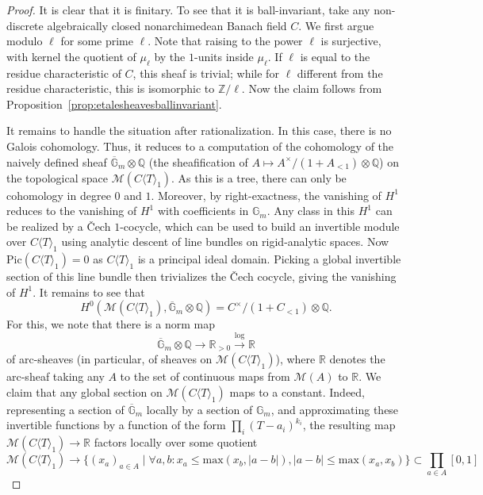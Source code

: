 \documentclass[11pt]{amsart}
\numberwithin{equation}{section}
\numberwithin{theorem}{section}
\theoremstyle{definition}
\begin{document}
\begin{proof} It is clear that it is finitary. To see that it is ball-invariant, take any non-discrete algebraically closed nonarchimedean Banach field $C$. We first argue modulo $\ell$ for some prime $\ell$. Note that raising to the power $\ell$ is surjective, with kernel the quotient of $\mu_{\ell}$ by the $1$-units inside $\mu_\ell$. If $\ell$ is equal to the residue characteristic of $C$, this sheaf is trivial; while for $\ell$ different from the residue characteristic, this is isomorphic to $\mathbb Z/\ell$. Now the claim follows from Proposition~\ref{prop:etalesheavesballinvariant}.

It remains to handle the situation after rationalization. In this case, there is no Galois cohomology. Thus, it reduces to a computation of the cohomology of the naively defined sheaf $\overline{\mathbb G}_m\otimes \mathbb Q$ (the sheafification of $A\mapsto A^\times/(1 + A_{<1})\otimes \mathbb Q$) on the topological space $\mathcal M(C\langle T\rangle_1)$. As this is a tree, there can only be cohomology in degree $0$ and $1$. Moreover, by right-exactness, the vanishing of $H^1$ reduces to the vanishing of $H^1$ with coefficients in $\mathbb G_m$. Any class in this $H^1$ can be realized by a \v{C}ech $1$-cocycle, which can be used to build an invertible module over $C\langle T\rangle_1$ using analytic descent of line bundles on rigid-analytic spaces. Now $\mathrm{Pic}(C\langle T\rangle_1)=0$ as $C\langle T\rangle_1$ is a principal ideal domain. Picking a global invertible section of this line bundle then trivializes the \v{C}ech cocycle, giving the vanishing of $H^1$. It remains to see that
\[
H^0(\mathcal M(C\langle T\rangle_1),\overline{\mathbb G}_m\otimes \mathbb Q)=C^{\times}/(1+C_{<1})\otimes \mathbb Q.
\]
For this, we note that there is a norm map
\[
\overline{\mathbb G}_m\otimes \mathbb Q\to \mathbb R_{>0}\xrightarrow{\mathrm{log}} \mathbb R
\]
of arc-sheaves (in particular, of sheaves on $\mathcal M(C\langle T\rangle_1)$), where $\mathbb R$ denotes the arc-sheaf taking any $A$ to the set of continuous maps from $\mathcal M(A)$ to $\mathbb R$. We claim that any global section on $\mathcal M(C\langle T\rangle_1)$ maps to a constant. Indeed, representing a section of $\overline{\mathbb G}_m$ locally by a section of $\mathbb G_m$, and approximating these invertible functions by a function of the form $\prod_i (T-a_i)^{k_i}$, the resulting map $\mathcal M(C\langle T\rangle_1)\to \mathbb R$ factors locally over some quotient
\[
\mathcal M(C\langle T\rangle_1)\to \Big\{(x_a)_{a\in A}\mid \forall a,b: x_a\leq \mathrm{max}(x_b,|a-b|), |a-b|\leq \mathrm{max}(x_a,x_b)\Big\}\subset \prod_{a\in A} [0,1]
\]
\end{proof}
\end{document}
